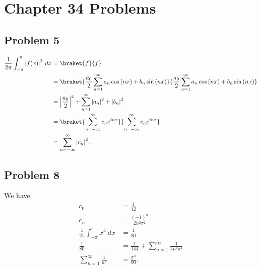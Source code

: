 \documentclass[10pt]{mypackage}
\begin{document}
\section{Chapter 34 Problems}%
\subsection{Problem 5}%
\begin{align*}
  \frac{1}{2\pi}\int_{-\pi}^{\pi} \left\vert f(x) \right\vert^2\:dx &= \braket{f}{f}\\
                                                                    &= \braket{\frac{a_0}{2}\sum_{n=1}^{\infty}a_n\cos\left(nx\right) + b_n\sin\left(nx\right)}{\frac{a_0}{2}\sum_{n=1}^{\infty}a_n\cos\left(nx\right) + b_n\sin\left(nx\right)}\\
                                                                    &= \left\vert \frac{a_0}{2} \right\vert^2 + \sum_{n=1}^{\infty}\left\vert a_n \right\vert^2 + \left\vert b_n \right\vert^2\\
                                                                    &= \braket{\sum_{n=-\infty}^{\infty}c_ne^{inx}}{\sum_{n=-\infty}^{\infty}c_ne^{inx}}\\
                                                                    &= \sum_{n=-\infty}^{\infty}\left\vert c_n \right\vert^2.
\end{align*}

\subsection{Problem 8}%
We have
\begin{align*}
  c_0 &= \frac{1}{12}\\
  c_n &= \frac{\left(-1\right)^n}{2n^2\pi^2}\\
  \frac{1}{2\pi}\int_{-\pi}^{\pi} x^4\:dx &= \frac{1}{80}\\
  \frac{1}{80} &= \frac{1}{144} + \sum_{n=1}^{\infty}\frac{1}{4n^4\pi^4}\\
  \sum_{n=1}^{\infty} \frac{1}{n^4} &= \frac{\pi^4}{90}.
\end{align*}
\end{document}
